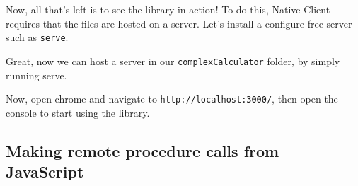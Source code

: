 \begin{Shaded}
\begin{Highlighting}[]
\DataTypeTok{>}
\KeywordTok{>}
    \KeywordTok{>}
    \NormalTok{\});}
\end{Highlighting}
\end{Shaded}

Now, all that's left is to see the library in action! To do this, Native
Client requires that the files are hosted on a server. Let's install a
configure-free server such as \texttt{serve}.

\begin{Shaded}
\begin{Highlighting}[]
 
\end{Highlighting}
\end{Shaded}

Great, now we can host a server in our \texttt{complexCalculator}
folder, by simply running serve.

\begin{Shaded}
\begin{Highlighting}[]
\end{Highlighting}
\end{Shaded}

\begin{Shaded}
\begin{Highlighting}[]
 
\end{Highlighting}
\end{Shaded}

Now, open chrome and navigate to \texttt{http://localhost:3000/}, then
open the console to start using the library.

\subsection{Making remote procedure calls from
JavaScript}\label{making-remote-procedure-calls-from-javascript}

